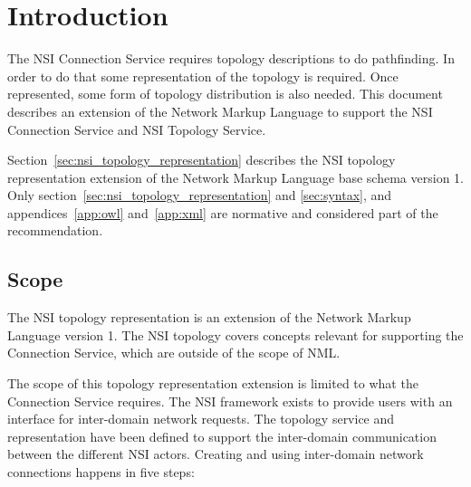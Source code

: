 \documentclass[12pt]{article}  %
\begin{document}
\tableofcontents

\newcommand{\qq}{\symbol{34}} %
\newcommand{\q}{\symbol{39}} %
\newcommand{\underscore}{\symbol{95}} %

\newcommand{\MUST}{\textsc{must}}
\newcommand{\MUSTNOT}{\textsc{must not}}
\newcommand{\REQUIRED}{\textsc{required}}
\newcommand{\SHALL}{\textsc{shall}}
\newcommand{\SHALLNOT}{\textsc{shall not}}
\newcommand{\SHOULD}{\textsc{should}}
\newcommand{\SHOULDNOT}{\textsc{should not}}
\newcommand{\RECOMMENDED}{\textsc{recommended}}
\newcommand{\MAY}{\textsc{may}}
\newcommand{\OPTIONAL}{\textsc{optional}}

\newpage

\section{Introduction}


 The NSI Connection Service requires topology descriptions to do 
pathfinding. In order to do that some representation of the topology is required. 
Once represented, some form of topology distribution is also needed. This document 
describes an extension of the Network Markup Language\cite{GFD.206} to support the NSI Connection Service\cite{gfd-nsi-connection} and NSI Topology Service\cite{gfd-nsi-topo-serv}.

Section~\ref{sec:nsi_topology_representation} describes the NSI topology representation extension of the Network Markup Language base schema version 1. Only section~\ref{sec:nsi_topology_representation} and \ref{sec:syntax}, and appendices~\ref{app:owl} and~\ref{app:xml} are normative and considered part of the recommendation.

\subsection{Scope}

The NSI topology representation is an extension of the Network Markup Language version 1. The NSI topology covers concepts relevant for supporting the Connection Service, which are outside of the scope of NML.

The scope of this topology representation extension is limited to what the Connection Service requires.
The NSI framework exists to provide users with an interface for inter-domain network requests. The topology service and representation have been defined to support the inter-domain communication between the different NSI actors. Creating and using inter-domain network connections happens in five steps:
\end{document}
